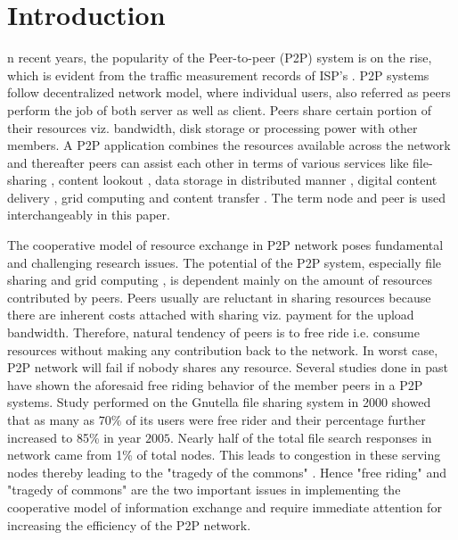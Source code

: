 \documentclass[journal]{IEEEtran}
\begin{document}
\section{Introduction}

n recent years, the popularity of the {P}{eer}-to-peer (P2P) system is on the rise, which is  evident from the traffic measurement records of ISP's \cite{eMule}\cite{Kazza}\cite{BitTorrent}. P2P systems follow decentralized network model, where individual users, also referred as peers perform the job of  both server as well as client. Peers share certain portion of their resources  viz. bandwidth, disk storage or processing power with other members. A P2P application combines the resources available across the network and thereafter peers can assist each other in terms of various services like file-sharing \cite{FileSharing}, content lookout \cite{content_search_1}\cite{content_search_2}\cite{content_search_3}\cite{content_search_4}, data storage in distributed manner \cite{DataStorage}, digital content delivery \cite{ContentDelivery}, grid computing \cite{GridComputing} and content transfer \cite{anonymous_transfer}. The term node and peer is used interchangeably in this paper.


The cooperative model of resource exchange in P2P network poses fundamental and challenging research issues. The potential of the P2P system, especially file sharing \cite{FileSharing} and grid computing \cite{GridComputing}, is dependent mainly on the amount of resources contributed by peers. Peers usually are reluctant in sharing resources because there are inherent costs attached with sharing viz. payment for the upload bandwidth. Therefore, natural tendency of peers is to free ride i.e. consume resources without making any contribution back to the network. In worst case, P2P network will fail if nobody shares any resource. Several studies done in past have shown the aforesaid free riding behavior of the member peers in a P2P systems.  Study performed on the Gnutella file sharing system in 2000 \cite{Adar} showed that as many as $70\%$ of its users were free rider and their percentage further increased to 85\% \cite{Hughes} in year $2005$. Nearly half of the total file search responses in network came from 1\% of total nodes. This leads to congestion in these serving nodes thereby leading to the "tragedy of the commons" \cite{tragedyofcommon}. Hence "free riding" and "tragedy of commons" are the two important issues in implementing the cooperative model of information exchange and require immediate attention for increasing the efficiency of the P2P network.
\end{document}
